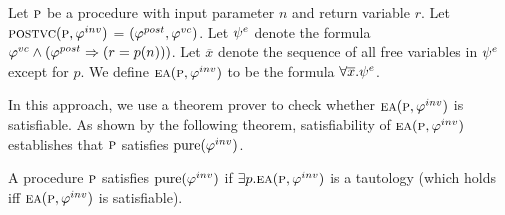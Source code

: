 Let $\textsc{p}$ be a procedure with input parameter $n$ and return variable $r$.
Let\\ $\textsc{postvc}({\textsc{p}},{\varphi^{inv}})$ = $(\varphi^{post},\varphi^{vc})$.
Let $\psi^e$ denote the formula $\varphi^{vc} \wedge (\varphi^{post} \Rightarrow (r = p(n)))$.
Let $\overline{x}$ denote the sequence of all free variables in $\psi^e$ except for $p$.
We define $\textsc{ea}(\textsc{p},\varphi^{inv})$ to be the formula $ \forall \overline{x}. \psi^e$.

In this approach, we use a theorem prover to check whether $\textsc{ea}(\textsc{p},\varphi^{inv})$ is satisfiable.
As shown by the following theorem, satisfiability of $\textsc{ea}(\textsc{p},\varphi^{inv})$ establishes that $\textsc{p}$
satisfies $\mathrm{pure}(\varphi^{inv})$.

\begin{theorem}
\label{theorem:EA}
A procedure $\textsc{p}$ satisfies $\mathrm{pure}(\varphi^{inv})$ if
$\exists p. \textsc{ea}(\textsc{p},\varphi^{inv})$ is a tautology
(which holds iff $\textsc{ea}(\textsc{p},\varphi^{inv})$ is satisfiable).
\end{theorem}

